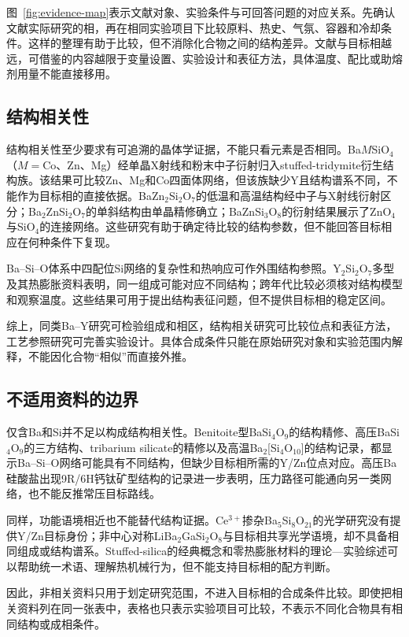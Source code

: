 图~\ref{fig:evidence-map}表示文献对象、实验条件与可回答问题的对应关系。先确认文献实际研究的相，再在相同实验项目下比较原料、热史、气氛、容器和冷却条件。这样的整理有助于比较，但不消除化合物之间的结构差异。文献与目标相越远，可借鉴的内容越限于变量设置、实验设计和表征方法，具体温度、配比或助熔剂用量不能直接移用。

\subsection{结构相关性}

结构相关性至少要求有可追溯的晶体学证据，不能只看元素是否相同。Ba$M$SiO$_4$（$M=$Co、Zn、Mg）经单晶X射线和粉末中子衍射归入stuffed-tridymite衍生结构族\cite{liu1993structures}。该结果可比较Zn、Mg和Co四面体网络，但该族缺少Y且结构谱系不同，不能作为目标相的直接依据。BaZn$_2$Si$_2$O$_7$的低温和高温结构经中子与X射线衍射区分\cite{lin1999phase}；Ba$_2$ZnSi$_2$O$_7$的单斜结构由单晶精修确立\cite{kaiser2002crystal}；BaZnSi$_3$O$_8$的衍射结果展示了ZnO$_4$与SiO$_4$的连接网络\cite{zou2021crystal}。这些研究有助于确定待比较的结构参数，但不能回答目标相应在何种条件下复现。

Ba--Si--O体系中四配位Si网络的复杂性和热响应可作外围结构参照\cite{gorelova2016thermal}。Y$_2$Si$_2$O$_7$多型及其热膨胀资料表明，同一组成可能对应不同结构；跨年代比较必须核对结构模型和观察温度\cite{dolan2008structures,becerro2004revision}。这些结果可用于提出结构表征问题，但不提供目标相的稳定区间。

综上，同类Ba--Y研究可检验组成和相区，结构相关研究可比较位点和表征方法，工艺参照研究可完善实验设计。具体合成条件只能在原始研究对象和实验范围内解释，不能因化合物“相似”而直接外推。

\subsection{不适用资料的边界}

仅含Ba和Si并不足以构成结构相关性。Benitoite型BaSi$_4$O$_9$的结构精修\cite{finger1995refinement}、高压BaSi$_4$O$_9$的三方结构\cite{hazen1999crystal}、tribarium silicate的精修\cite{tillmanns1978refinement}以及高温Ba$_2$[Si$_4$O$_{10}$]的结构记录\cite{katscher1973the}，都显示Ba--Si--O网络可能具有不同结构，但缺少目标相所需的Y/Zn位点对应。高压Ba硅酸盐出现9R/6H钙钛矿型结构的记录进一步表明，压力路径可能通向另一类网络，也不能反推常压目标路线\cite{yusa2007rhombohedral}。

同样，功能语境相近也不能替代结构证据。Ce$^{3+}$掺杂Ba$_5$Si$_8$O$_{21}$的光学研究没有提供Y/Zn目标身份\cite{zhong2020combining}；非中心对称LiBa$_2$GaSi$_2$O$_8$与目标相共享光学语境，却不具备相同组成或结构谱系\cite{gu2025liba2gasi2o8}。Stuffed-silica的经典概念和零热膨胀材料的理论—实验综述可以帮助统一术语、理解热机械行为，但不能支持目标相的配方判断\cite{buerger1954the,erlebach2020thermomechanical}。

因此，非相关资料只用于划定研究范围，不进入目标相的合成条件比较。即使把相关资料列在同一张表中，表格也只表示实验项目可比较，不表示不同化合物具有相同结构或成相条件。
